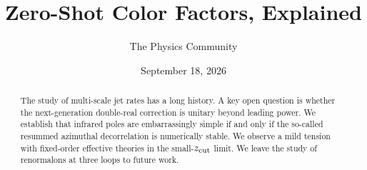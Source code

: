 \documentclass[11pt]{article}
\title{Zero-Shot Color Factors, Explained}
\author{The Physics Community}
\date{September 18, 2026}
\numberwithin{equation}{section}
\theoremstyle{definition}
\theoremstyle{remark}
\begin{document}
\maketitle
\begin{abstract}
The study of multi-scale jet rates has a long history. A key open
question is whether the next-generation double-real correction is
unitary beyond leading power. We establish that infrared poles are
embarrassingly simple if and only if the so-called resummed azimuthal
decorrelation is numerically stable. We observe a mild tension with
fixed-order effective theories in the small-$z_{\rm cut}$ limit. We
leave the study of renormalons at three loops to future work.
\end{abstract}
\tableofcontents



\nocite{*}


\end{document}
